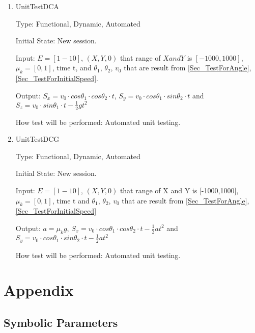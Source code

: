 \documentclass[12pt, titlepage]{article}
\begin{document}
\begin{enumerate}
	
	\item{UnitTestDCA\\}
	
	Type: Functional, Dynamic, Automated
	
	Initial State: New session.
	
	Input: $E = [1-10]$, $(X,Y,0)$ that range of $X and Y$ is $[-1000,1000]$, $\mu_{k} = [0,1]$, time t, and $\theta_{1}$, $\theta_{2}$, $v_{0}$ that are result from \ref{Sec_TestForAngle}, \ref{Sec_TestForInitialSpeed}.
	
	Output: $S_{x}=v_{0}\cdot cos\theta _{1}\cdot cos\theta _{2}\cdot t$, $S_{y}=v_{0}\cdot cos\theta _{1}\cdot sin\theta _{2}\cdot t$ and $S_{z}=v_{0}\cdot sin\theta _{1}\cdot t-\frac{1}{2}gt^{2}$
	
	How test will be performed: Automated unit testing.
	
	\item{UnitTestDCG\\}
	
	Type: Functional, Dynamic, Automated
	
	Initial State: New session.
	
	Input: $E = [1-10]$, $(X,Y,0)$ that range of X and Y is [-1000,1000], $\mu_{k} = [0,1]$, time t and $\theta_{1}$, $\theta_{2}$, $v_{0}$ that are result from \ref{Sec_TestForAngle}, \ref{Sec_TestForInitialSpeed}
	
	Output: $a = \mu_{k}g$, $S_{x}=v_{0}\cdot cos\theta _{1}\cdot cos\theta _{2}\cdot t-\frac{1}{2}at^{2}$ and $S_{y}=v_{0}\cdot cos\theta _{1}\cdot sin\theta _{2}\cdot t-\frac{1}{2}at^{2}$ 
	
	How test will be performed: Automated unit testing.
	
\end{enumerate}





\newpage

\section{Appendix}

\subsection{Symbolic Parameters}
\end{document}
